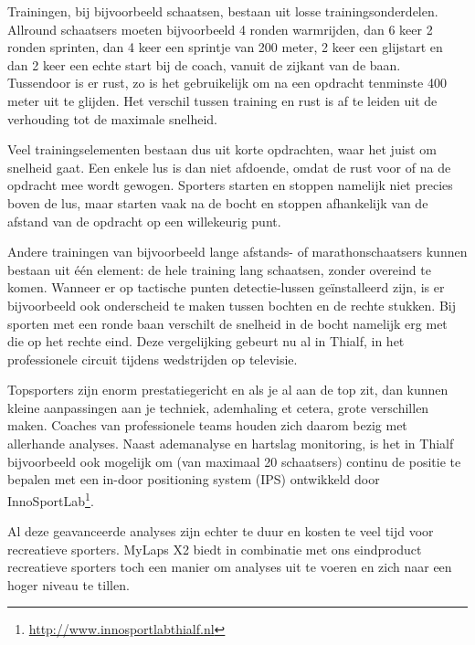 Trainingen, bij bijvoorbeeld schaatsen, bestaan uit losse trainingsonderdelen. Allround schaatsers moeten bijvoorbeeld 4 ronden warmrijden, dan 6 keer 2 ronden sprinten, dan 4 keer een sprintje van 200 meter, 2 keer een glijstart en dan 2 keer een echte start bij de coach, vanuit de zijkant van de baan. Tussendoor is er rust, zo is het gebruikelijk om na een opdracht tenminste 400 meter uit te glijden. Het verschil tussen training en rust is af te leiden uit de verhouding tot de maximale snelheid.

Veel trainingselementen bestaan dus uit korte opdrachten, waar het juist om snelheid gaat. Een enkele lus is dan niet afdoende, omdat de rust voor of na de opdracht mee wordt gewogen. Sporters starten en stoppen namelijk niet precies boven de lus, maar starten vaak na de bocht en stoppen afhankelijk van de afstand van de opdracht op een willekeurig punt. 

Andere trainingen van bijvoorbeeld lange afstands- of marathonschaatsers kunnen bestaan uit één element: de hele training lang schaatsen, zonder overeind te komen. Wanneer er op tactische punten detectie-lussen geïnstalleerd zijn, is er bijvoorbeeld ook onderscheid te maken tussen bochten en de rechte stukken. Bij sporten met een ronde baan verschilt de snelheid in de bocht namelijk erg met die op het rechte eind. Deze vergelijking gebeurt nu al in Thialf, in het professionele circuit tijdens wedstrijden op televisie.

Topsporters zijn enorm prestatiegericht en als je al aan de top zit, dan kunnen kleine aanpassingen aan je techniek, ademhaling et cetera, grote verschillen maken. Coaches van professionele teams houden zich daarom bezig met allerhande analyses. Naast ademanalyse en hartslag monitoring, is het in Thialf bijvoorbeeld ook mogelijk om (van maximaal 20 schaatsers) continu de positie te bepalen met een in-door positioning system (IPS) ontwikkeld door InnoSportLab\footnote{\url{http://www.innosportlabthialf.nl}}.

Al deze geavanceerde analyses zijn echter te duur en kosten te veel tijd voor recreatieve sporters. MyLaps X2 biedt in combinatie met ons eindproduct recreatieve sporters toch een manier om analyses uit te voeren en zich naar een hoger niveau te tillen.